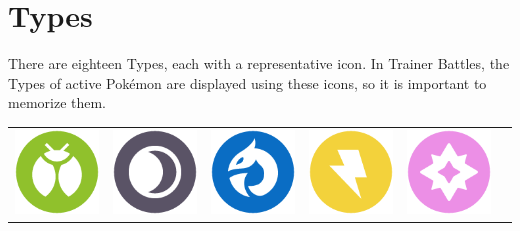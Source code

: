 \chapter{Types}
\label{chap:types}
There are eighteen Types, each with a representative icon.
In Trainer Battles, the Types of active Pokémon are displayed
 using these icons, so it is important to memorize them.
\begin{table}[h]
  \begin{tabular}{c c c c c c}
  \includegraphics[scale=.25]{images/bug.png} &
    \includegraphics[scale=.25]{images/dark.png} &
    \includegraphics[scale=.25]{images/dragon.png} &
    \includegraphics[scale=.25]{images/electric.png} &
    \includegraphics[scale=.25]{images/fairy.png} &

\end{tabular}
\end{table}
